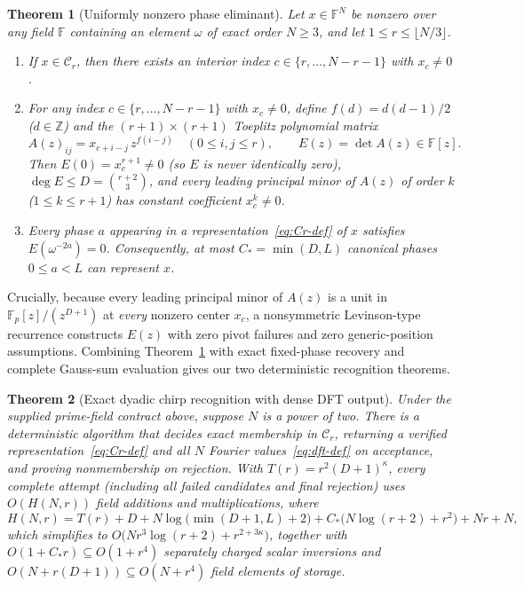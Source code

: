 \documentclass[11pt,reqno]{amsart}
\numberwithin{equation}{section}
\newtheorem{theorem}{Theorem}[section]
\theoremstyle{definition}
\theoremstyle{remark}
\newcommand{\F}{\mathbb{F}}
\newcommand{\Z}{\mathbb{Z}}
\begin{document}
\begin{theorem}[Uniformly nonzero phase eliminant]
\label{thm:eliminant}
Let $x\in\F^N$ be nonzero over any field $\F$ containing an element $\omega$ of exact order $N\ge 3$, and let $1\le r\le \lfloor N/3\rfloor$.
\begin{enumerate}[label=(\arabic*),leftmargin=2em]
\item If $x\in\mathcal{C}_r$, then there exists an interior index $c\in\{r,\ldots,N-r-1\}$ with $x_c\neq 0$.
\item For any index $c\in\{r,\ldots,N-r-1\}$ with $x_c\neq 0$, define $f(d)=d(d-1)/2$ ($d\in\Z$) and the $(r+1)\times(r+1)$ Toeplitz polynomial matrix
\begin{equation}
\label{eq:Az-def}
A(z)_{ij} = x_{c+i-j}\,z^{f(i-j)}\quad (0\le i,j\le r),\qquad E(z) = \det A(z)\in\F[z].
\end{equation}
Then $E(0) = x_c^{r+1}\neq 0$ (so $E$ is never identically zero), $\deg E \le D = \binom{r+2}{3}$, and every leading principal minor of $A(z)$ of order $k$ ($1\le k\le r+1$) has constant coefficient $x_c^k\neq 0$.
\item Every phase $a$ appearing in a representation~\eqref{eq:Cr-def} of $x$ satisfies $E(\omega^{-2a}) = 0$. Consequently, at most $C_* = \min(D,L)$ canonical phases $0\le a < L$ can represent $x$.
\end{enumerate}
\end{theorem}

Crucially, because every leading principal minor of $A(z)$ is a unit in $\F_p[z]/(z^{D+1})$ at \emph{every} nonzero center $x_c$, a nonsymmetric Levinson-type recurrence constructs $E(z)$ with zero pivot failures and zero generic-position assumptions. Combining Theorem~\ref{thm:eliminant} with exact fixed-phase recovery and complete Gauss-sum evaluation gives our two deterministic recognition theorems.

\begin{theorem}[Exact dyadic chirp recognition with dense DFT output]
\label{thm:dyadic}
Under the supplied prime-field contract above, suppose $N$ is a power of two. There is a deterministic algorithm that decides exact membership in $\mathcal{C}_r$, returning a verified representation~\eqref{eq:Cr-def} and all $N$ Fourier values~\eqref{eq:dft-def} on acceptance, and proving nonmembership on rejection. With $T(r) = r^2(D+1)^\kappa$, every complete attempt (including all failed candidates and final rejection) uses $O(H(N,r))$ field additions and multiplications, where
\begin{equation}
\label{eq:H-env}
H(N,r) = T(r) + D + N\log\bigl(\min(D+1,L)+2\bigr) + C_*\bigl(N\log(r+2) + r^2\bigr) + Nr + N,
\end{equation}
which simplifies to $O\bigl(Nr^3\log(r+2) + r^{2+3\kappa}\bigr)$, together with $O(1+C_*r)\subseteq O(1+r^4)$ separately charged scalar inversions and $O(N+r(D+1))\subseteq O(N+r^4)$ field elements of storage.
\end{theorem}
\end{document}
